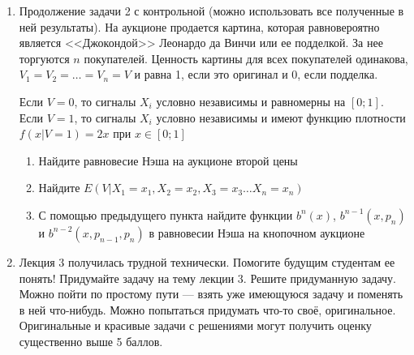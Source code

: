 \documentclass[pdftex,12pt,a4paper]{article}
\begin{document}
\begin{enumerate}


\item Продолжение задачи 2 с контрольной (можно использовать все полученные в ней результаты).
На аукционе продается картина, которая равновероятно является <<Джокондой>> Леонардо да Винчи или ее подделкой. За нее торгуются $ n $ покупателей. Ценность картины для всех покупателей одинакова, $ V_{1}=V_{2}=\ldots=V_{n}=V $ и равна 1, если это оригинал и 0, если подделка.

Если $ V=0 $, то сигналы $ X_{i} $ условно независимы и равномерны на $ [0;1] $. Если $ V=1 $, то сигналы $ X_{i} $ условно независимы и имеют функцию плотности $ f(x|V=1)=2x $ при  $x\in [0;1] $

\begin{enumerate}
\item Найдите равновесие Нэша на аукционе второй цены
\item Найдите $ E(V|X_{1}=x_{1},X_{2}=x_{2},X_{3}=x_{3}\ldots X_{n}=x_{n}) $
\item С помощью предыдущего пункта найдите функции $ b^{n}(x) $,  $ b^{n-1}(x,p_{n}) $  и $ b^{n-2}(x,p_{n-1},p_{n}) $ в равновесии Нэша на кнопочном аукционе
\end{enumerate}



\item Лекция 3 получилась трудной технически. Помогите будущим студентам ее понять! Придумайте задачу на тему лекции 3. Решите придуманную задачу. Можно пойти по простому пути --- взять уже имеющуюся задачу и поменять в ней что-нибудь. Можно попытаться придумать что-то своё, оригинальное. Оригинальные и красивые задачи с решениями могут получить оценку существенно выше 5 баллов. 


\end{enumerate}





\printindex %
\end{document}
